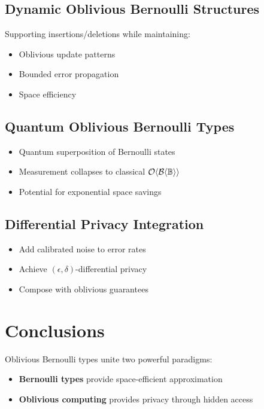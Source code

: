 \documentclass[11pt,final,hidelinks]{article}
\newcommand{\BernBool}{\mathcal{B}\langle \Bool \rangle}
\begin{document}
\subsection{Dynamic Oblivious Bernoulli Structures}

Supporting insertions/deletions while maintaining:
\begin{itemize}
    \item Oblivious update patterns
    \item Bounded error propagation
    \item Space efficiency
\end{itemize}

\subsection{Quantum Oblivious Bernoulli Types}

\begin{itemize}
    \item Quantum superposition of Bernoulli states
    \item Measurement collapses to classical $\Obv{\BernBool}$
    \item Potential for exponential space savings
\end{itemize}

\subsection{Differential Privacy Integration}

\begin{itemize}
    \item Add calibrated noise to error rates
    \item Achieve $(\epsilon, \delta)$-differential privacy
    \item Compose with oblivious guarantees
\end{itemize}

\section{Conclusions}

Oblivious Bernoulli types unite two powerful paradigms:
\begin{itemize}
    \item \textbf{Bernoulli types} provide space-efficient approximation
    \item \textbf{Oblivious computing} provides privacy through hidden access
\end{itemize}
\end{document}
